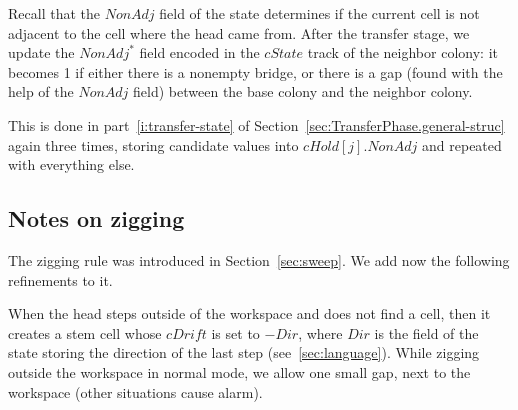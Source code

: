 \documentclass[12pt]{memoir}
\newcommand{\fld}[1]{\ensuremath{\textit{#1}}}
\newcommand{\Addr}{\fld{Addr}}
\newcommand{\Dir}{\fld{Dir}}
\newcommand{\cDrift}{\fld{cDrift}}
\newcommand{\NonAdj}{\fld{NonAdj}}
\newcommand{\cHold}{\fld{cHold}}
\newcommand{\Kind}{\fld{Kind}}
\newcommand{\cKind}{\fld{cKind}}
\newcommand{\cState}{\fld{cState}}
\newcommand{\Sweep}{\fld{Sw}}
\newcommand{\Member}{\mathrm{Member}}
\newcommand{\Target}{\mathrm{Target}}
\begin{document}





Recall that the \( \NonAdj \) field of the state determines
if the current cell is not adjacent to the cell  where the head came from.
After the transfer stage, we update the \( \NonAdj^{*} \) field encoded in the
\( \cState \) track of the neighbor colony: it becomes 1 if either there is a nonempty bridge,
or there is a gap (found with the help of the \( \NonAdj \) field) between the base colony
and the neighbor colony.

This is done in part~\ref{i:transfer-state} 
of Section~\ref{sec:TransferPhase.general-struc}
again three times, storing candidate values into \( \cHold[j].\NonAdj \)
and repeated with everything else.

 \subsection{Notes on zigging}\label{sec:zigging}

The zigging rule was introduced in Section~\ref{sec:sweep}.
We add now the following refinements to it.

When the head steps outside of the workspace and
does not find a cell, then it creates a stem cell whose
\( \cDrift \) is set to \( -\Dir \), where \( \Dir \) is the field
of the state storing the direction of the last step (see~\ref{sec:language}).
While zigging outside the workspace in normal mode,
we allow one small gap, next to the workspace (other situations cause alarm).
\end{document}
